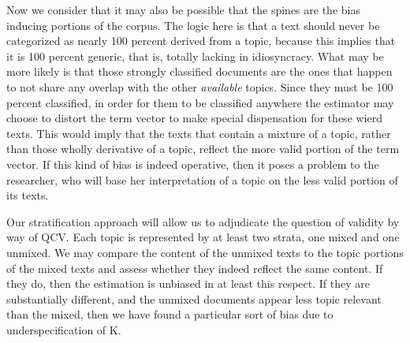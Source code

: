 \documentclass[]{book}
\theoremstyle{definition}
\theoremstyle{definition}
\theoremstyle{definition}
\theoremstyle{remark}
\begin{document}
Now we consider that it may also be possible that the spines are the
bias inducing portions of the corpus. The logic here is that a text
should never be categorized as nearly 100 percent derived from a topic,
because this implies that it is 100 percent generic, that is, totally
lacking in idiosyncracy. What may be more likely is that those strongly
classified documents are the ones that happen to not share any overlap
with the other \emph{available} topics. Since they must be 100 percent
classified, in order for them to be classified anywhere the estimator
may choose to distort the term vector to make special dispensation for
these wierd texts. This would imply that the texts that contain a
mixture of a topic, rather than those wholly derivative of a topic,
reflect the more valid portion of the term vector. If this kind of bias
is indeed operative, then it poses a problem to the researcher, who will
base her interpretation of a topic on the less valid portion of its
texts.

Our stratification approach will allow us to adjudicate the question of
validity by way of QCV. Each topic is represented by at least two
strata, one mixed and one unmixed. We may compare the content of the
unmixed texts to the topic portions of the mixed texts and assess
whether they indeed reflect the same content. If they do, then the
estimation is unbiased in at least this respect. If they are
substantially different, and the unmixed documents appear less topic
relevant than the mixed, then we have found a particular sort of bias
due to underspecification of K.
\end{document}
